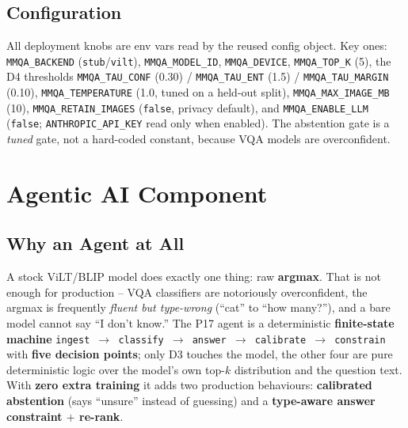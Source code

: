 \documentclass[12pt,a4paper]{article}
\begin{document}
\subsection{Configuration}

All deployment knobs are env vars read by the reused config object. Key ones: \texttt{MMQA\_BACKEND} (\texttt{stub}/\texttt{vilt}), \texttt{MMQA\_MODEL\_ID}, \texttt{MMQA\_DEVICE}, \texttt{MMQA\_TOP\_K} (5), the D4 thresholds \texttt{MMQA\_TAU\_CONF} (0.30) / \texttt{MMQA\_TAU\_ENT} (1.5) / \texttt{MMQA\_TAU\_MARGIN} (0.10), \texttt{MMQA\_TEMPERATURE} (1.0, tuned on a held-out split), \texttt{MMQA\_MAX\_IMAGE\_MB} (10), \texttt{MMQA\_RETAIN\_IMAGES} (\texttt{false}, privacy default), and \texttt{MMQA\_ENABLE\_LLM} (\texttt{false}; \texttt{ANTHROPIC\_API\_KEY} read only when enabled). The abstention gate is a \emph{tuned} gate, not a hard-coded constant, because VQA models are overconfident.

\section{Agentic AI Component}

\subsection{Why an Agent at All}

A stock ViLT/BLIP model does exactly one thing: raw \textbf{argmax}. That is not enough for production -- VQA classifiers are notoriously overconfident, the argmax is frequently \emph{fluent but type-wrong} (``cat'' to ``how many?''), and a bare model cannot say ``I don't know.'' The P17 agent is a deterministic \textbf{finite-state machine} \texttt{ingest $\rightarrow$ classify $\rightarrow$ answer $\rightarrow$ calibrate $\rightarrow$ constrain} with \textbf{five decision points}; only D3 touches the model, the other four are pure deterministic logic over the model's own top-$k$ distribution and the question text. With \textbf{zero extra training} it adds two production behaviours: \textbf{calibrated abstention} (says ``unsure'' instead of guessing) and a \textbf{type-aware answer constraint $+$ re-rank}.
\end{document}
